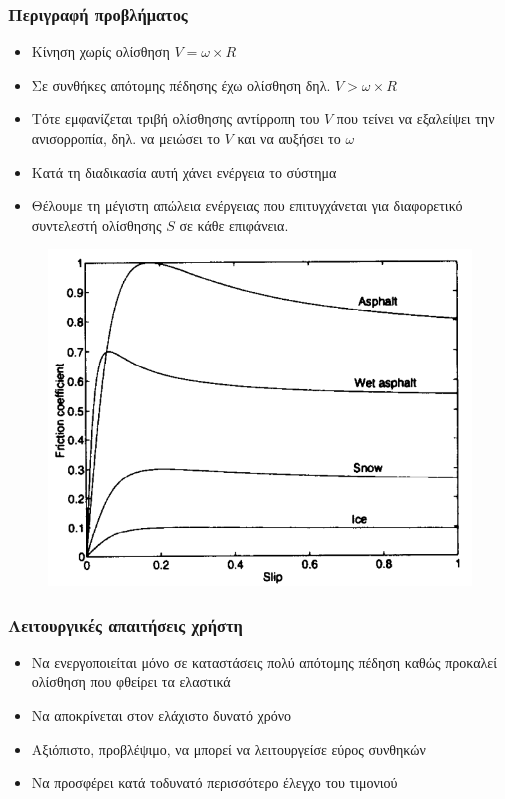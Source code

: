 \documentclass[fleqn]{beamer}
\begin{document}
\begin{frame}
  \frametitle{Περιγραφή προβλήματος}
  \begin{itemize}
      \item Κίνηση χωρίς ολίσθηση $V = \omega \times R$
      \item Σε συνθήκες απότομης πέδησης έχω ολίσθηση δηλ. $V > \omega \times R$
      \item Τότε εμφανίζεται τριβή ολίσθησης αντίρροπη του $V$ που τείνει να εξαλείψει την ανισορροπία, δηλ. να μειώσει το $V$ και να αυξήσει το $\omega$
      \item Κατά τη διαδικασία αυτή χάνει ενέργεια το σύστημα
      \item Θέλουμε τη μέγιστη απώλεια ενέργειας που επιτυγχάνεται για διαφορετικό συντελεστή ολίσθησης $S$ σε κάθε επιφάνεια.
  \end{itemize}
      \begin{figure}[H]
        \begin{center}
        \includegraphics[scale=0.2]{images/slip-friction-diagram.png}
        \end{center}
    \end{figure}
\end{frame}

\begin{frame}
  \frametitle{Λειτουργικές απαιτήσεις χρήστη}
  \begin{itemize}
      \item Nα ενεργοποιείται μόνο σε καταστάσεις πολύ απότομης πέδηση καθώς προκαλεί ολίσθηση που φθείρει τα ελαστικά
      \item Να αποκρίνεται στον ελάχιστο δυνατό χρόνο
      \item Aξιόπιστο, προβλέψιμο, να μπορεί να λειτουργείσε εύρος συνθηκών
      \item Nα προσφέρει κατά τοδυνατό περισσότερο έλεγχο του τιμονιού
  \end{itemize}
\end{frame}
\end{document}
